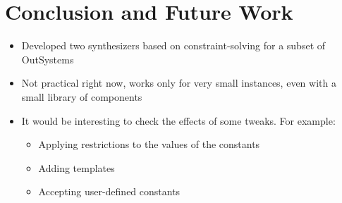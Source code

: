 \documentclass[notes=hide]{beamer}
\begin{document}
\section{Conclusion and Future Work} %
\begin{frame}{\secname}
  \begin{itemize}
  \item Developed two synthesizers based on constraint-solving for a subset of
    OutSystems
  \item Not practical right now, works only for very small instances, even with
    a small library of components
  \item It would be interesting to check the effects of some tweaks. For example: 
    \begin{itemize}
    \item Applying restrictions to the values of the constants
    \item Adding templates
    \item Accepting user-defined constants
    \end{itemize}
  \end{itemize}
\end{frame}
\end{document}
